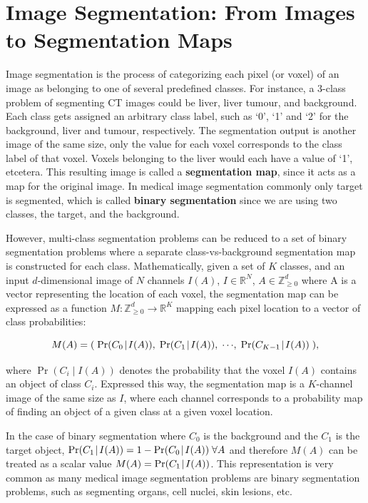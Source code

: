 \section{Image Segmentation: From Images to Segmentation Maps}

Image segmentation is the process of categorizing each pixel (or voxel) of an image as belonging to one of several predefined classes. For instance, a 3-class problem of segmenting CT images could be liver, liver tumour, and background. Each class gets assigned an arbitrary class label, such as `0', `1' and `2' for the background, liver and tumour, respectively. The segmentation output is another image of the same size, only the value for each voxel corresponds to the class label of that voxel. Voxels belonging to the liver would each have a value of `1', etcetera. This resulting image is called a \textbf{segmentation map}, since it acts as a map for the original image. In medical image segmentation commonly only target is segmented, which is called \textbf{binary segmentation} since we are using two classes, the target, and the background.

However, multi-class segmentation problems can be reduced to a set of binary segmentation problems where a separate class-vs-background segmentation map is constructed for each class. Mathematically, given a set of $K$ classes, and an input $d$-dimensional image of $N$ channels $I(A)$, $I \in \mathbb{R}^{N}$, $A \in \mathbb{Z}_{\geq0}^d$ where A is a vector representing the location of each voxel, the segmentation map can be expressed as a function $M : \mathbb{Z}_{\geq0}^d \rightarrow \mathbb{R}^K$ mapping each pixel location to a vector of class probabilities:

\begin{equation}
M(A) = (\;\operatorname{Pr}({C_0}\!\mid\!{I(A)}),\; \operatorname{Pr}({C_1}\!\mid\!{I(A)}),\; \cdots\!,\;  \operatorname{Pr}({C_{K - 1}}\!\mid\!{I(A)})\;),
\end{equation}

where $\operatorname{Pr} (C_i \!\mid\! I(A))$ denotes the probability that the voxel $I(A)$ contains an object of class $C_i$. Expressed this way, the segmentation map is a $K$-channel image of the same size as $I$, where each channel corresponds to a probability map of finding an object of a given class at a given voxel location. 

In the case of binary segmentation where $C_0$ is the background and the $C_1$ is the target object, $\operatorname{Pr}({C_1}\!\mid\!{I(A)}) = 1 - \operatorname{Pr}({C_0}\!\mid\!{I(A)})\; \forall A$ and therefore $M(A)$ can be treated as a scalar value $M(A) = \operatorname{Pr}({C_1}\!\mid\!{I(A)})$. This representation is very common as many medical image segmentation problems are binary segmentation problems, such as segmenting organs, cell nuclei, skin lesions, etc.


